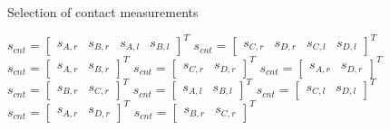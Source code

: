\begin{algorithm}
    \caption{Selection of contact measurements}
    \label{alg:cnt_switch}
    \begin{algorithmic}
        \RETURN $ s_{cnt}= \begin{bmatrix}s_{A,r} &s_{B,r} &s_{A,l} &s_{B,l} \end{bmatrix}^T$ 
        \RETURN $ s_{cnt}= \begin{bmatrix}s_{C,r} &s_{D,r} &s_{C,l} &s_{D,l} \end{bmatrix}^T$ 
        \ENDIF
        \RETURN $ s_{cnt}= \begin{bmatrix}s_{A,r} &s_{B,r}  \end{bmatrix}^T$ 
        \RETURN $ s_{cnt}= \begin{bmatrix}s_{C,r} &s_{D,r}  \end{bmatrix}^T$ 
        \RETURN $ s_{cnt}= \begin{bmatrix}s_{A,r} &s_{D,r}  \end{bmatrix}^T$ 
        \RETURN $ s_{cnt}= \begin{bmatrix}s_{B,r} &s_{C,r}  \end{bmatrix}^T$ 
        \ENDIF
        \RETURN $ s_{cnt}= \begin{bmatrix} s_{A,l} &s_{B,l} \end{bmatrix}^T$ 
        \RETURN $ s_{cnt}= \begin{bmatrix} s_{C,l} &s_{D,l} \end{bmatrix}^T$ 
        \RETURN $ s_{cnt}= \begin{bmatrix}s_{A,r} &s_{D,r}  \end{bmatrix}^T$ 
        \RETURN $ s_{cnt}= \begin{bmatrix}s_{B,r} &s_{C,r}  \end{bmatrix}^T$ 
        \ENDIF
    \ENDIF
    \end{algorithmic}
\end{algorithm}

